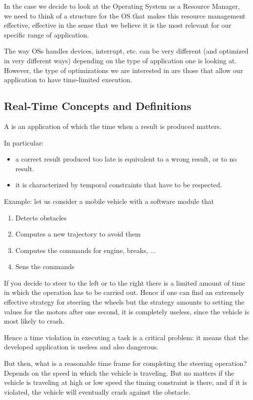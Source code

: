 In the case we decide to look at the Operating System as a Resource Manager, we need to think of a structure for the OS that makes this resource management effective, effective in the sense that we believe it is the most relevant for our specific range of application.

The way OSs handles devices, interrupt, etc. can be very different (and optimized in very different ways) depending on the type of application one is looking at. However, the type of optimizations we are interested in are those that allow our application to have time-limited execution.

\subsection{Real-Time Concepts and Definitions}
A  is an application of which the time when a result is produced matters.

In particular:
\begin{itemize}
\item a correct result produced too late is equivalent to a wrong result, or to no result.
\item it is characterized by temporal constraints that have to be respected.
\end{itemize}

Example: let us consider a mobile vehicle with a software module that 
\begin{enumerate}
\item Detects obstacles 
\item Computes a new trajectory to avoid them
\item Computes the commands for engine, breaks, ...
\item Sens the commands
\end{enumerate}
If you decide to steer to the left or to the right there is a limited amount of time in which the operation has to be carried out. Hence if one can find an extremely effective strategy for steering the wheels but the strategy amounts to setting the values for the motors after one second, it is completely useless, since the vehicle is most likely to crash.

Hence a time violation in executing a task is a critical problem: it means that the developed application is useless and also dangerous.

But then, what is a reasonable time frame for completing the steering operation?\\
Depends on the speed in which the vehicle is traveling. But no matters if the vehicle is traveling at high or low speed the timing constraint is there, and if it is violated, the vehicle will eventually crash against the obstacle.


